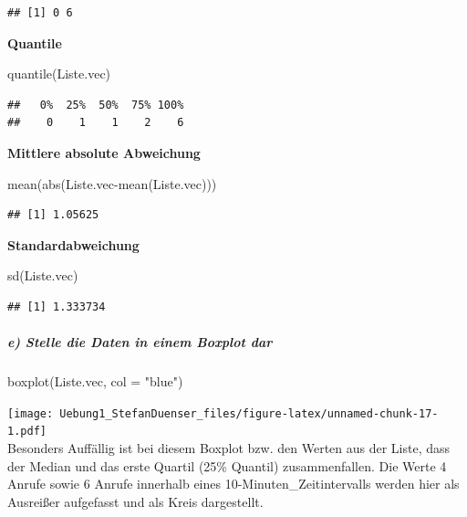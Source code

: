 \documentclass[
]{article}
\newenvironment{Shaded}{\begin{snugshade}}{\end{snugshade}}
\newcommand{\AttributeTok}[1]{\textcolor[rgb]{0.77,0.63,0.00}{#1}}
\newcommand{\FunctionTok}[1]{\textcolor[rgb]{0.00,0.00,0.00}{#1}}
\newcommand{\NormalTok}[1]{#1}
\newcommand{\SpecialCharTok}[1]{\textcolor[rgb]{0.00,0.00,0.00}{#1}}
\newcommand{\StringTok}[1]{\textcolor[rgb]{0.31,0.60,0.02}{#1}}
\begin{document}
\begin{verbatim}
## [1] 0 6
\end{verbatim}

\textbf{Quantile}

\begin{Shaded}
\begin{Highlighting}[]
\FunctionTok{quantile}\NormalTok{(Liste.vec)}
\end{Highlighting}
\end{Shaded}

\begin{verbatim}
##   0%  25%  50%  75% 100% 
##    0    1    1    2    6
\end{verbatim}

\textbf{Mittlere absolute Abweichung}

\begin{Shaded}
\begin{Highlighting}[]
\FunctionTok{mean}\NormalTok{(}\FunctionTok{abs}\NormalTok{(Liste.vec}\SpecialCharTok{{-}}\FunctionTok{mean}\NormalTok{(Liste.vec)))}
\end{Highlighting}
\end{Shaded}

\begin{verbatim}
## [1] 1.05625
\end{verbatim}

\textbf{Standardabweichung}

\begin{Shaded}
\begin{Highlighting}[]
\FunctionTok{sd}\NormalTok{(Liste.vec)}
\end{Highlighting}
\end{Shaded}

\begin{verbatim}
## [1] 1.333734
\end{verbatim}

\hypertarget{e-stelle-die-daten-in-einem-boxplot-dar}{%
\subparagraph{\texorpdfstring{\textbf{e) Stelle die Daten in einem
Boxplot
dar}}{e) Stelle die Daten in einem Boxplot dar}}\label{e-stelle-die-daten-in-einem-boxplot-dar}}

\begin{Shaded}
\begin{Highlighting}[]
\FunctionTok{boxplot}\NormalTok{(Liste.vec, }\AttributeTok{col =} \StringTok{"blue"}\NormalTok{)}
\end{Highlighting}
\end{Shaded}

\texttt{[image: Uebung1\_StefanDuenser\_files/figure-latex/unnamed-chunk-17-1.pdf]}\\
Besonders Auffällig ist bei diesem Boxplot bzw. den Werten aus der
Liste, dass der Median und das erste Quartil (25\% Quantil)
zusammenfallen. Die Werte 4 Anrufe sowie 6 Anrufe innerhalb eines
10-Minuten\_Zeitintervalls werden hier als Ausreißer aufgefasst und als
Kreis dargestellt.
\end{document}
